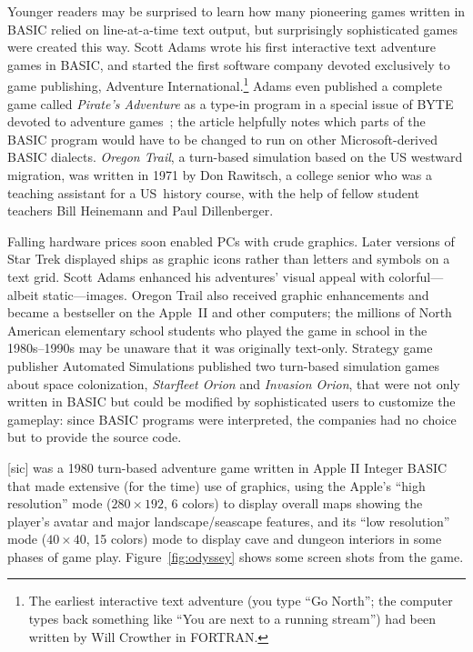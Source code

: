 Younger readers may be surprised to learn how many pioneering games
written in BASIC relied on line-at-a-time text output, but
surprisingly sophisticated games were created this way.
Scott Adams wrote his first interactive text adventure games in BASIC, and started
the first software company devoted exclusively to game publishing,
Adventure International.\footnote{The earliest interactive text adventure (you type
``Go North''; the computer types back something like ``You are next to a
running stream'') had been written by Will Crowther in FORTRAN.}
Adams even published a complete game called \emph{Pirate's Adventure} as
a type-in program in a special issue of BYTE devoted to adventure
games~\cite{byte80:adventure}; the article helpfully notes which parts
of the BASIC program would have to be changed to run on other
Microsoft-derived BASIC dialects.
\emph{Oregon Trail}, a turn-based simulation based on the US westward
migration, was written in 1971 by Don Rawitsch, a college senior who was
a teaching assistant for a US~history course, with the help of
fellow student teachers Bill Heinemann and Paul Dillenberger.

Falling hardware prices soon enabled PCs with crude graphics.
Later versions of Star Trek displayed ships as graphic icons rather than
letters and symbols on a text grid.
Scott Adams enhanced his adventures' visual appeal with colorful---albeit
static---images.
Oregon Trail also received graphic enhancements and became
a bestseller on the Apple~II and other computers;
the millions of
North American elementary school students who played the game in school
in the 1980s--1990s
may be unaware that it was originally text-only.
Strategy game publisher
Automated Simulations published two turn-based simulation games about
space colonization,
\emph{Starfleet Orion} and \emph{Invasion Orion}, that were not only
written in BASIC but could be modified by sophisticated users to
customize the gameplay: since BASIC programs were interpreted, the
companies had no choice but to provide the source code.

 [sic] was a 1980 turn-based adventure game
written in Apple II Integer BASIC
that made extensive (for the time) use of
graphics, using the Apple's ``high resolution'' mode ($280\times 192$, 6 colors)
to display overall maps showing the player's
avatar and major landscape/seascape features, and its
``low resolution'' mode ($40\times 40$, 15
colors) mode to display cave and dungeon interiors in some phases of game play.
Figure~\ref{fig:odyssey} shows some screen shots from the game.

